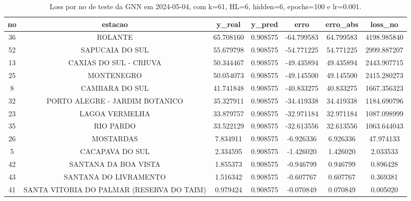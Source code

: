 \begin{table}[h]
\centering
\caption{Loss por no de teste da GNN em 2024-05-04, com k=61, HL=6, hidden=6, epochs=100 e lr=0.001.}
\label{tab:gnn_loss_k61_hl6_h6_e100_d20240504}
\begin{tabular}{ccccccc}
\toprule
no & estacao & y\_real & y\_pred & erro & erro\_abs & loss\_no \\
\midrule
36 & ROLANTE & 65.708160 & 0.908575 & -64.799583 & 64.799583 & 4198.985840 \\
52 & SAPUCAIA DO SUL & 55.679798 & 0.908575 & -54.771225 & 54.771225 & 2999.887207 \\
13 & CAXIAS DO SUL - CRIUVA & 50.344467 & 0.908575 & -49.435894 & 49.435894 & 2443.907715 \\
25 & MONTENEGRO & 50.054073 & 0.908575 & -49.145500 & 49.145500 & 2415.280273 \\
8 & CAMBARA DO SUL & 41.741848 & 0.908575 & -40.833275 & 40.833275 & 1667.356323 \\
32 & PORTO ALEGRE - JARDIM BOTANICO & 35.327911 & 0.908575 & -34.419338 & 34.419338 & 1184.690796 \\
23 & LAGOA VERMELHA & 33.879757 & 0.908575 & -32.971184 & 32.971184 & 1087.098999 \\
35 & RIO PARDO & 33.522129 & 0.908575 & -32.613556 & 32.613556 & 1063.644043 \\
26 & MOSTARDAS & 7.834911 & 0.908575 & -6.926336 & 6.926336 & 47.974133 \\
5 & CACAPAVA DO SUL & 2.334595 & 0.908575 & -1.426020 & 1.426020 & 2.033533 \\
42 & SANTANA DA BOA VISTA & 1.855373 & 0.908575 & -0.946799 & 0.946799 & 0.896428 \\
43 & SANTANA DO LIVRAMENTO & 1.516342 & 0.908575 & -0.607767 & 0.607767 & 0.369381 \\
41 & SANTA VITORIA DO PALMAR (RESERVA DO TAIM) & 0.979424 & 0.908575 & -0.070849 & 0.070849 & 0.005020 \\
\bottomrule
\end{tabular}
\end{table}
